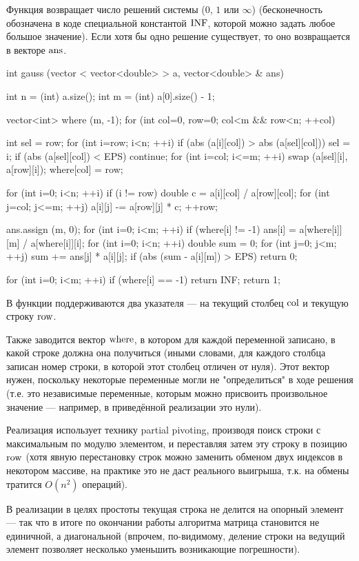 Функция возвращает число решений системы ($0$, $1$ или $\infty$) (бесконечность обозначена в коде специальной константой $\rm INF$, которой можно задать любое большое значение). Если хотя бы одно решение существует, то оно возвращается в векторе $\rm ans$.

\code
int gauss (vector < vector<double> > a, vector<double> & ans) {
	int n = (int) a.size();
	int m = (int) a[0].size() - 1;

	vector<int> where (m, -1);
	for (int col=0, row=0; col<m && row<n; ++col) {
		int sel = row;
		for (int i=row; i<n; ++i)
			if (abs (a[i][col]) > abs (a[sel][col]))
				sel = i;
		if (abs (a[sel][col]) < EPS)
			continue;
		for (int i=col; i<=m; ++i)
			swap (a[sel][i], a[row][i]);
		where[col] = row;

		for (int i=0; i<n; ++i)
			if (i != row) {
				double c = a[i][col] / a[row][col];
				for (int j=col; j<=m; ++j)
					a[i][j] -= a[row][j] * c;
			}
		++row;
	}

	ans.assign (m, 0);
	for (int i=0; i<m; ++i)
		if (where[i] != -1)
			ans[i] = a[where[i]][m] / a[where[i]][i];
	for (int i=0; i<n; ++i) {
		double sum = 0;
		for (int j=0; j<m; ++j)
			sum += ans[j] * a[i][j];
		if (abs (sum - a[i][m]) > EPS)
			return 0;
	}

	for (int i=0; i<m; ++i)
		if (where[i] == -1)
			return INF;
	return 1;
}
\endcode

В функции поддерживаются два указателя --- на текущий столбец $\rm col$ и текущую строку $\rm row$.

Также заводится вектор $\rm where$, в котором для каждой переменной записано, в какой строке должна она получиться (иными словами, для каждого столбца записан номер строки, в которой этот столбец отличен от нуля). Этот вектор нужен, поскольку некоторые переменные могли не "определиться" в ходе решения (т.е. это независимые переменные, которым можно присвоить произвольное значение --- например, в приведённой реализации это нули).

Реализация использует технику partial pivoting, производя поиск строки с максимальным по модулю элементом, и переставляя затем эту строку в позицию $\rm row$ (хотя явную перестановку строк можно заменить обменом двух индексов в некотором массиве, на практике это не даст реального выигрыша, т.к. на обмены тратится $O(n^2)$ операций).

В реализации в целях простоты текущая строка не делится на опорный элемент --- так что в итоге по окончании работы алгоритма матрица становится не единичной, а диагональной (впрочем, по-видимому, деление строки на ведущий элемент позволяет несколько уменьшить возникающие погрешности).

